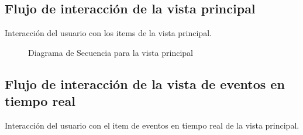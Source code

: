 \begin{minipage}{\linewidth}
  \subsection{Flujo de interacción de la vista principal}
  Interacción del usuario con los items de la vista principal.
  \begin{figure}[H]
    \caption{Diagrama de Secuencia para la vista principal}
  \end{figure}
\end{minipage}
\subsection{Flujo de interacción de la vista de eventos en tiempo real}
Interacción del usuario con el item de eventos en tiempo real de la vista principal.

